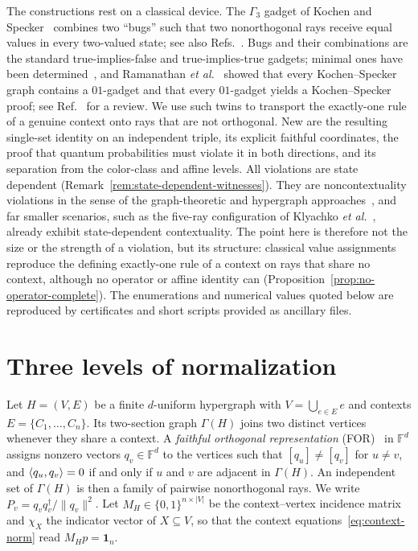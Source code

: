 \documentclass[aps,pra,reprint,superscriptaddress,longbibliography,nofootinbib,floatfix,10pt]{revtex4-2}
\theoremstyle{definition}\newtheorem{definition}[theorem]{Definition}
\theoremstyle{remark}\newtheorem{remark}[theorem]{Remark}
\newcommand{\F}{\mathbb F}\newcommand{\Z}{\mathbb Z}\newcommand{\PP}{\mathbb P}
\begin{document}
The constructions rest on a classical device. The $\Gamma_3$ gadget of Kochen and Specker~\cite{kochen1} combines two ``bugs'' such that two nonorthogonal rays receive equal values in every two-valued state; see also Refs.~\cite{svozil-2018-whycontexts,svozil-2020-c}. Bugs and their combinations are the standard true-implies-false and true-implies-true gadgets; minimal ones have been determined~\cite{2018-minimalYIYS}, and Ramanathan \emph{et al.}~\cite{Ramanathan-18} showed that every Kochen--Specker graph contains a $01$-gadget and that every $01$-gadget yields a Kochen--Specker proof; see Ref.~\cite{cabello2021contextuality} for a review. We use such twins to transport the exactly-one rule of a genuine context onto rays that are not orthogonal. New are the resulting single-set identity on an independent triple, its explicit faithful coordinates, the proof that quantum probabilities must violate it in both directions, and its separation from the color-class and affine levels. All violations are state dependent (Remark~\ref{rem:state-dependent-witnesses}). They are noncontextuality violations in the sense of the graph-theoretic and hypergraph approaches~\cite{cabello-severini-winter-2014,acin-fritz-leverrier-sainz-2015}, and far smaller scenarios, such as the five-ray configuration of Klyachko \emph{et al.}~\cite{Klyachko-2008}, already exhibit state-dependent contextuality. The point here is therefore not the size or the strength of a violation, but its structure: classical value assignments reproduce the defining exactly-one rule of a context on rays that share no context, although no operator or affine identity can (Proposition~\ref{prop:no-operator-complete}). The enumerations and numerical values quoted below are reproduced by certificates and short scripts provided as ancillary files.

\section{Three levels of normalization}\label{sec:framework}
Let $H=(V,E)$ be a finite $d$-uniform hypergraph with $V=\bigcup_{e\in E}e$ and contexts $E=\{C_1,\ldots,C_n\}$. Its two-section graph $\Gamma(H)$ joins two distinct vertices whenever they share a context. A \emph{faithful orthogonal representation} (FOR)~\cite{lovasz-79,Portillo-2015} in $\F^d$ assigns nonzero vectors $q_v\in\F^d$ to the vertices such that $[q_u]\neq[q_v]$ for $u\neq v$, and $\langle q_u,q_v\rangle=0$ if and only if $u$ and $v$ are adjacent in $\Gamma(H)$. An independent set of $\Gamma(H)$ is then a family of pairwise nonorthogonal rays. We write $P_v=q_vq_v^\dagger/\|q_v\|^2$. Let $M_H\in\{0,1\}^{n\times|V|}$ be the context--vertex incidence matrix and $\chi_X$ the indicator vector of $X\subseteq V$, so that the context equations~\eqref{eq:context-norm} read $M_Hp=\mathbf 1_n$.
\end{document}
